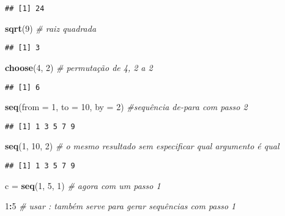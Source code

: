\documentclass[]{article}
\newenvironment{Shaded}{\begin{snugshade}}{\end{snugshade}}
\newcommand{\CommentTok}[1]{\textcolor[rgb]{0.56,0.35,0.01}{\textit{#1}}}
\newcommand{\DataTypeTok}[1]{\textcolor[rgb]{0.13,0.29,0.53}{#1}}
\newcommand{\DecValTok}[1]{\textcolor[rgb]{0.00,0.00,0.81}{#1}}
\newcommand{\KeywordTok}[1]{\textcolor[rgb]{0.13,0.29,0.53}{\textbf{#1}}}
\newcommand{\NormalTok}[1]{#1}
\newcommand{\OperatorTok}[1]{\textcolor[rgb]{0.81,0.36,0.00}{\textbf{#1}}}
\newcommand{\StringTok}[1]{\textcolor[rgb]{0.31,0.60,0.02}{#1}}
\begin{document}
\begin{verbatim}
## [1] 24
\end{verbatim}

\begin{Shaded}
\begin{Highlighting}[]
\KeywordTok{sqrt}\NormalTok{(}\DecValTok{9}\NormalTok{) }\CommentTok{# raiz quadrada}
\end{Highlighting}
\end{Shaded}

\begin{verbatim}
## [1] 3
\end{verbatim}

\begin{Shaded}
\begin{Highlighting}[]
\KeywordTok{choose}\NormalTok{(}\DecValTok{4}\NormalTok{, }\DecValTok{2}\NormalTok{) }\CommentTok{# permutação de 4, 2 a 2}
\end{Highlighting}
\end{Shaded}

\begin{verbatim}
## [1] 6
\end{verbatim}

\begin{Shaded}
\begin{Highlighting}[]
\KeywordTok{seq}\NormalTok{(}\DataTypeTok{from =} \DecValTok{1}\NormalTok{,}
    \DataTypeTok{to =} \DecValTok{10}\NormalTok{, }
    \DataTypeTok{by =} \DecValTok{2}\NormalTok{) }\CommentTok{#sequência de-para com passo 2}
\end{Highlighting}
\end{Shaded}

\begin{verbatim}
## [1] 1 3 5 7 9
\end{verbatim}

\begin{Shaded}
\begin{Highlighting}[]
\KeywordTok{seq}\NormalTok{(}\DecValTok{1}\NormalTok{, }\DecValTok{10}\NormalTok{, }\DecValTok{2}\NormalTok{) }\CommentTok{# o mesmo resultado sem especificar qual argumento é qual}
\end{Highlighting}
\end{Shaded}

\begin{verbatim}
## [1] 1 3 5 7 9
\end{verbatim}

\begin{Shaded}
\begin{Highlighting}[]
\NormalTok{c =}\StringTok{ }\KeywordTok{seq}\NormalTok{(}\DecValTok{1}\NormalTok{, }\DecValTok{5}\NormalTok{, }\DecValTok{1}\NormalTok{) }\CommentTok{# agora com um passo 1}

\DecValTok{1}\OperatorTok{:}\DecValTok{5} \CommentTok{# usar : também serve para gerar sequências com passo 1}
\end{Highlighting}
\end{Shaded}
\end{document}
